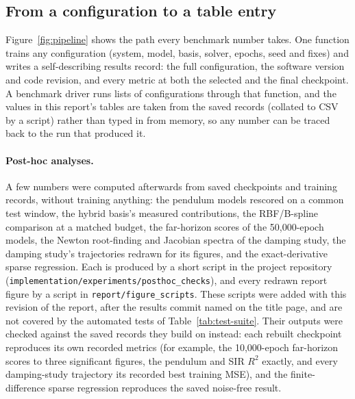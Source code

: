 \subsection{From a configuration to a table entry}

Figure~\ref{fig:pipeline} shows the path every benchmark number takes. One
function trains any configuration (system, model, basis, solver, epochs,
seed and fixes) and writes a self-describing results record: the full
configuration, the software version and code revision, and every metric at
both the selected and the final checkpoint. A benchmark driver runs lists of
configurations through that function, and the values in this report's
tables are taken from the saved records (collated to CSV by a script)
rather than typed in from memory, so any number can be traced back to the
run that produced it.

\paragraph{Post-hoc analyses.} A few numbers were computed afterwards from
saved checkpoints and training records, without training anything: the
pendulum models rescored on a common test window, the hybrid basis's
measured contributions, the RBF/B-spline comparison at a matched budget, the
far-horizon scores of the 50{,}000-epoch models, the Newton root-finding and
Jacobian spectra of the damping study, the damping study's trajectories
redrawn for its figures, and the exact-derivative sparse regression. Each is
produced by a short script in the project repository
(\texttt{implementation/experiments/posthoc\_checks}), and every redrawn
report figure by a script in \texttt{report/figure\_scripts}. These scripts
were added with this revision of the report, after the results commit named
on the title page, and are not covered by the automated tests of
Table~\ref{tab:test-suite}. Their outputs were checked against the saved
records they build on instead: each rebuilt checkpoint reproduces its own
recorded metrics (for example, the 10{,}000-epoch far-horizon scores to
three significant figures, the pendulum and SIR $R^2$ exactly, and every
damping-study trajectory its recorded best training MSE), and the
finite-difference sparse regression reproduces the saved noise-free result.

